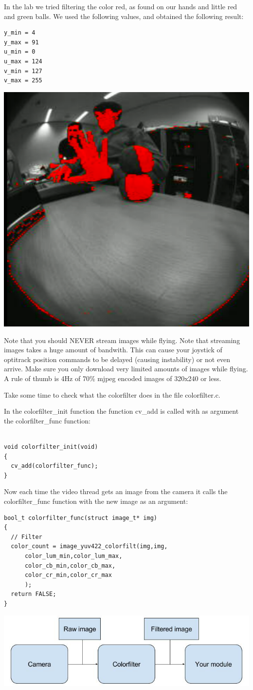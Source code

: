\documentclass{article}
\begin{document}
In the lab we tried filtering the color red, as found on our hands and little red and green balls. We used the following values, and obtained the following result:
\begin{verbatim}
y_min = 4
y_max = 91
u_min = 0
u_max = 124
v_min = 127
v_max = 255
\end{verbatim}
\includegraphics[width=0.8\linewidth]{filtered}

Note that you should NEVER stream images while flying. Note that streaming images takes a huge amount of bandwith. This can cause your joystick of optitrack position commands to be delayed (causing instability) or not even arrive. Make sure you only download very limited amounts of images while flying. A rule of thumb is 4Hz of 70\% mjpeg encoded images of 320x240 or less.  

Take some time to check what the colorfilter does in the file colorfilter.c. 

In the colorfilter\_init function the function cv\_add is called with as argument the colorfilter\_func function:
\begin{verbatim}

void colorfilter_init(void)
{
  cv_add(colorfilter_func);
}

\end{verbatim}
Now each time the video thread gets an image from the camera it calls the colorfilter\_func function with the new image as an argument:
\begin{verbatim}
bool_t colorfilter_func(struct image_t* img)
{
  // Filter
  color_count = image_yuv422_colorfilt(img,img,
      color_lum_min,color_lum_max,
      color_cb_min,color_cb_max,
      color_cr_min,color_cr_max
      );
  return FALSE;
}
\end{verbatim}
\includegraphics[width=0.8\linewidth]{camerafilter}
\end{document}
